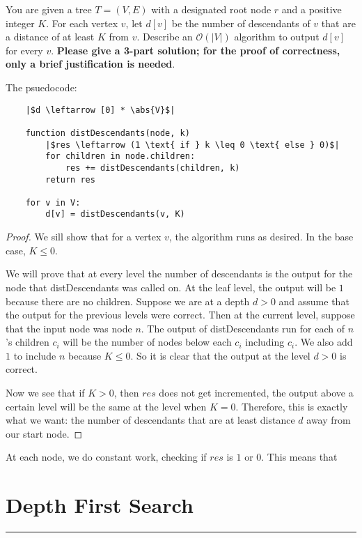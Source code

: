 \documentclass{article}
\begin{document}
You are given a tree $T = (V, E)$ with a designated root node $r$ and a positive integer $K$. For each vertex $v$, let $d[v]$ be the number of descendants of $v$ that are a distance of at least $K$ from $v$. Describe an $\mathcal{O}(\lvert V \rvert)$ algorithm to output $d[v]$ for every $v$. \textbf{Please give a 3-part solution; for the proof of correctness, only a brief justification is needed}.
    \begin{answer}
        The psuedocode:
        \begin{verbatim}
    |$d \leftarrow [0] * \abs{V}$|

    function distDescendants(node, k)
        |$res \leftarrow (1 \text{ if } k \leq 0 \text{ else } 0)$|
        for children in node.children:
            res += distDescendants(children, k)
        return res

    for v in V:
        d[v] = distDescendants(v, K)
        \end{verbatim}

        \begin{proof}
            We sill show that for a vertex $v$, the algorithm runs as desired. In the base case, $K \leq 0$. 

            We will prove that at every level the number of descendants is the output for the node that distDescendants was called on. At the leaf level, the output will be $1$ because there are no children. Suppose we are at a depth $d > 0$ and assume that the output for the previous levels were correct. Then at the current level, suppose that the input node was node $n$. The output of distDescendants run for each of $n$'s children $c_{i}$ will be the number of nodes below each $c_{i}$ including $c_{i}$. We also add $1$ to include $n$ because $K \leq 0$. So it is clear that the output at the level $d > 0$ is correct.

            Now we see that if $K > 0$, then $res$ does not get incremented, the output above a certain level will be the same at the level when $K = 0$. Therefore, this is exactly what we want: the number of descendants that are at least distance $d$ away from our start node.
        \end{proof}

        At each node, we do constant work, checking if $res$ is $1$ or $0$. This means that 
    \end{answer}

\newpage
\section*{Depth First Search}
\hrule
\end{document}

